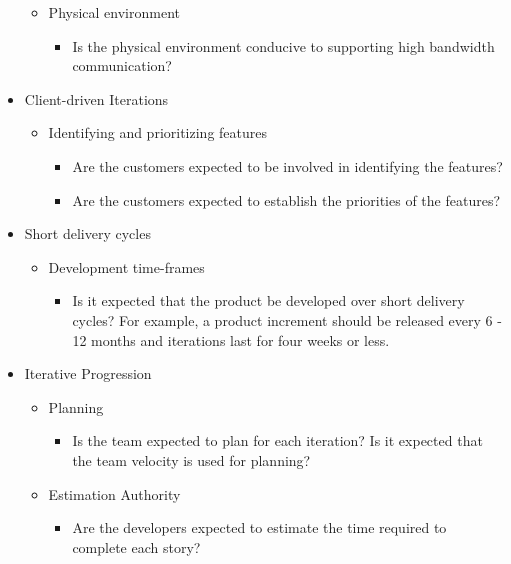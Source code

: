 \begin{appendices}
\begin{itemize}
\begin{itemize}
			\item Physical environment
				\begin{itemize}
					\item Is the physical environment conducive to supporting high bandwidth communication?
				\end{itemize}
		\end{itemize}
	\item Client-driven Iterations
		\begin{itemize}
			\item Identifying and prioritizing features
				\begin{itemize}
					\item Are the customers expected to be involved in identifying the features?
					\item Are the customers expected to establish the priorities of the features?
				\end{itemize}
		\end{itemize}
	\item Short delivery cycles
		\begin{itemize}
			\item Development time-frames
				\begin{itemize}
					\item Is it expected that the product be developed over short delivery cycles? For example, a product increment should be released every 6 - 12 months and iterations last for four weeks or less.
				\end{itemize}
		\end{itemize}
	\item Iterative Progression
		\begin{itemize}
			\item Planning
				\begin{itemize}
					\item Is the team expected to plan for each iteration?
					\addition Is it expected that the team velocity is used for planning?
				\end{itemize}
			\item Estimation Authority
				\begin{itemize}
					\item Are the developers expected to estimate the time required to complete each story?
				\end{itemize}

\end{itemize}
\end{itemize}
\end{appendices}

